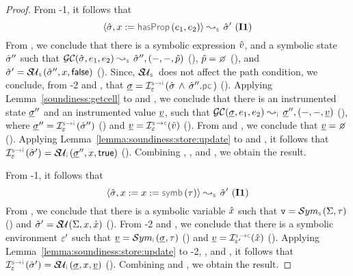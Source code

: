 \begin{proof}
\noindent {}
From \hyp{1}, it follows that 
$$\absbsemrule{\sstate, \jvar := \hasfield(\jsilexpr_1, \jsilexpr_2)}{\sstate'}{\symbolic} \text{ (\ieq{1})}$$
From , we conclude that there is a symbolic expression $\hat{v}$, and a symbolic state $\hat{\sigma}''$ such that 
$\absgetcellrule{\symbolic}{\sstate, \jsilexpr_1, \jsilexpr_2}{\sstate'', (-, -, \sexprp)}$ (), $\sexprp = \none$ (), 
and $\sstate' = \stupdt{\symbolic}(\sstate'', \jvar, \jfalse)$ (). 
Since, $\stupdt{\symbolic}$ does not affect the path condition, we conclude, from \hyp{2} and , that
$\istate = \interpret{\symbinst}{\senv}(\sstate \, \wedge \, \sstate''.\pcsel)$ ().
Applying Lemma~\ref{soundiness:getcell} to  and , we conclude that
there is an instrumented state $\underline{\sigma}''$ and an instrumented value $\underline{v}$, such that 
$\absgetcellrule{\instrumented}{\istate, \jsilexpr_1, \jsilexpr_2}{\istate'', (-, -, \ival)}$ (), 
where $\istate'' = \interpret{\symbinst}{\senv}(\sstate'')$ () and $\ival = \interpret{\symbconc}{\senv}(\sexprv)$ (). 
 From  and , we conclude that $\ival = \none$ (). 
Applying Lemma~\ref{lemma:soundiness:store:update} to  and , it follows
that  $\interpret{\symbinst}{\senv}(\sstate') = \stupdt{\instrumented}(\istate'', \jvar, \jtrue)$ ().
Combining , , and , we obtain the result. 
\vspace{5pt} 

\noindent {}
From \hyp{1}, it follows that 
$$\absbsemrule{\sstate, \jvar := \jvar := \makesymbolic(\jtype)}{\sstate'}{\symbolic} \text{ (\ieq{1})}$$ 
From , we conclude that there is a symbolic variable $\hat{x}$ such that 
$\absval = \absmakesymbolicrule{\symbolic}{\absstate, \jtype}$ () and $\hat{\sigma}' = \mathcal{S\!U}_{}(\Sigma, x, \hat{x})$ (). 
From \hyp{2} and , we conclude that there is a symbolic environment $\varepsilon'$ such that
$\ival = \absmakesymbolicrule{\instrumented}{\istate, \jtype}$ () and $\ival = \interpret{\symbconc}{\senv'}(\svar)$ (). 
Applying Lemma~\ref{lemma:soundiness:store:update} to \hyp{2}, , and , it follows that 
 $\interpret{\symbinst}{\senv}(\sstate') = \stupdt{\instrumented}(\istate, \jvar, \ival)$ ().
 Combining  and , we obtain the result.  
\end{proof}

